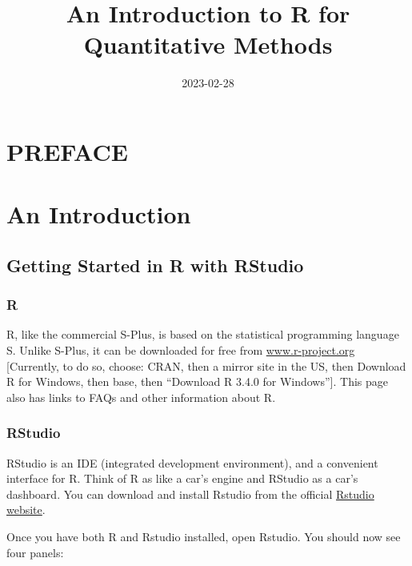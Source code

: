 \documentclass[
]{book}
\title{An Introduction to R for Quantitative Methods}
\author{}
\date{\vspace{-2.5em}2023-02-28}
\begin{document}
\maketitle

{
\setcounter{tocdepth}{1}
\tableofcontents
}
\hypertarget{preface}{%
\chapter*{PREFACE}\label{preface}}

\hypertarget{an-introduction}{%
\chapter{An Introduction}\label{an-introduction}}

\hypertarget{getting-started-in-r-with-rstudio}{%
\section*{Getting Started in R with RStudio}\label{getting-started-in-r-with-rstudio}}

\hypertarget{r}{%
\subsection*{R}\label{r}}

R, like the commercial S-Plus, is based on the statistical programming language S. Unlike S-Plus, it can be downloaded for free from \url{www.r-project.org} {[}Currently, to do so, choose: CRAN, then a mirror site in the US, then Download R for Windows, then base, then ``Download R 3.4.0 for Windows''{]}. This page also has links to FAQs and other information about R.

\hypertarget{rstudio}{%
\subsection*{RStudio}\label{rstudio}}

RStudio is an IDE (integrated development environment), and a convenient interface for R. Think of R as like a car's engine and RStudio as a car's dashboard. You can download and install Rstudio from the official \href{https://rstudio.com/products/rstudio/download/}{Rstudio website}.

Once you have both R and Rstudio installed, open Rstudio. You should now see four panels:
\end{document}
